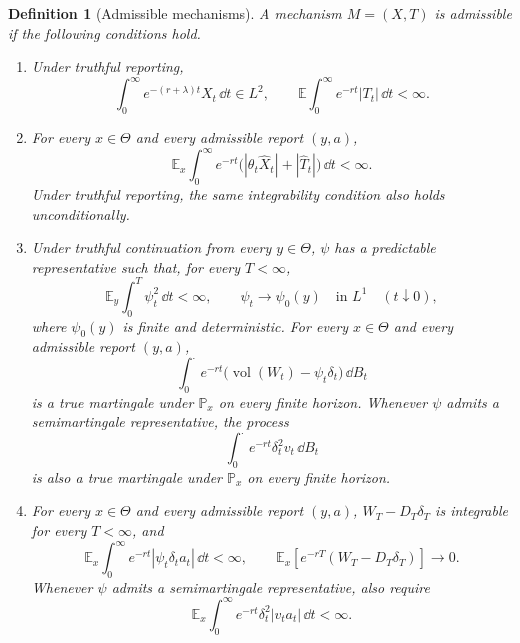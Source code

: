 \documentclass[12pt]{article}
\newtheorem{definition}{Definition}
\DeclareMathOperator{\vol}{vol}
\newcommand{\E}{\mathbb{E}}
\begin{document}
\begin{definition}[Admissible mechanisms]
\label{def:mechanisms-strong}
A mechanism \(M=(X,T)\) is admissible if the following conditions hold.

\begin{enumerate}[label=\textnormal{(M\arabic*)},leftmargin=2.8em]
  \item Under truthful reporting,
  \[
    \int_0^\infty e^{-(r+\lambda)t}X_t\,\dd t\in L^2,
    \qquad
    \E\int_0^\infty e^{-rt}|T_t|\,\dd t<\infty.
  \]

  \item For every \(x\in\Theta\) and every admissible report \((y,a)\),
  \begin{equation}\label{eq:mechanism-payoff}
    \E_x\int_0^\infty e^{-rt}
      \bigl(|\theta_t\widehat X_t|
            +|\widehat T_t|\bigr)\,\dd t<\infty.
  \end{equation}
  Under truthful reporting, the same integrability condition
also holds unconditionally.

  \item Under truthful continuation from every \(y\in\Theta\), \(\psi\)
  has a predictable representative such that, for every \(T<\infty\),
  \[
    \E_y\int_0^T\psi_t^2\,\dd t<\infty,
    \qquad
    \psi_t\longrightarrow\psi_0(y)
    \quad\text{in }L^1
    \quad(t\downarrow0),
  \]
  where \(\psi_0(y)\) is finite and deterministic. For every
  \(x\in\Theta\) and every admissible report \((y,a)\),
  \[
    \int_0^\cdot
      e^{-rt}\bigl(\vol(W_t)-\psi_t\delta_t\bigr)\,\dd B_t
  \]
  is a true martingale under \(\mathbb P_x\) on every finite horizon.
  Whenever \(\psi\) admits a semimartingale representative, the process
  \[
    \int_0^\cdot e^{-rt}\delta_t^2v_t\,\dd B_t
  \]
  is also a true martingale under \(\mathbb P_x\) on every finite
  horizon.

  \item For every \(x\in\Theta\) and every admissible report \((y,a)\),
  \(W_T-D_T\delta_T\) is integrable for every \(T<\infty\), and
  \[
    \E_x\int_0^\infty e^{-rt}
      |\psi_t\delta_ta_t|\,\dd t<\infty,
    \qquad
    \E_x\!\left[
      e^{-rT}(W_T-D_T\delta_T)
    \right]\longrightarrow0.
  \]
  Whenever \(\psi\) admits a semimartingale representative, also require
  \[
    \E_x\int_0^\infty e^{-rt}\delta_t^2
      |v_ta_t|\,\dd t<\infty.
  \]


\end{enumerate}
\end{definition}
\end{document}
